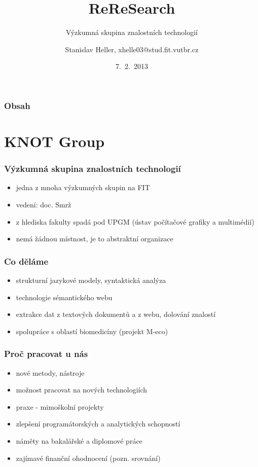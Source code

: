 \documentclass{beamer}
\title[ReReSearch, KNOT Group, FIT VUT\hspace{9em}\insertframenumber/
\inserttotalframenumber]{ReReSearch}
\subtitle[KNOT Group]{Výzkumná skupina znalostních technologií}
\author{Stanislav Heller, xhelle03@stud.fit.vutbr.cz}
\institute[FIT VUT]{
  Fakulta Informačních Technologií\\
  Vysoké Učení Technické v Brně
}
\date{7.~2.~2013}
\begin{document}
\begin{frame}
  \titlepage
\end{frame}

\begin{frame}
  \frametitle{Obsah}
  \tableofcontents
\end{frame}


\section{KNOT Group}

\begin{frame}
  \frametitle{Výzkumná skupina znalostních technologií}
  \begin{itemize}
    \item jedna z mnoha výzkumných skupin na FIT
    \item vedení: doc. Smrž
    \item z hlediska fakulty spadá pod UPGM (ústav počítačové grafiky a multimédií)
    \item nemá žádnou místnost, je to abstraktní organizace
  \end{itemize}
\end{frame}

\begin{frame}
  \frametitle{Co děláme}
  \begin{itemize}
    \item strukturní jazykové modely, syntaktická analýza
    \item technologie sémantického webu
    \item extrakce dat z textových dokumentů a z webu, dolování znalostí
    \item spolupráce s oblastí biomedicíny (projekt M-eco)
  \end{itemize}
\end{frame}

\begin{frame}
  \frametitle{Proč pracovat u nás}
  \begin{itemize}
    \item nové metody, nástroje
    \item možnost pracovat na nových technologiích
    \item praxe - mimoškolní projekty
    \item zlepšení programátorských a analytických schopností
    \item náměty na bakalářské a diplomové práce
    \item zajímavé finanční ohodnocení (pozn. srovnání)
  \end{itemize}
\end{frame}
\end{document}
